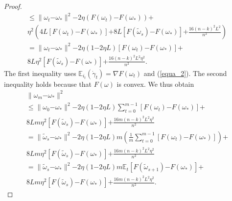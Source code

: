 \documentclass[letterpaper]{article}
\begin{document}
\begin{proof}
\begin{equation}
\begin{array}{ll}
\le \parallel  \omega_{t}\mathrm{-}\omega_\ast  \parallel^2  \mathrm{-}2\eta( F(\omega_t) \mathrm{-} F(\omega_\ast) ) \mathrm{+} \\
\eta^2 \left(  4L [F(\omega_t)\mathrm{-}F(\omega_\ast)] \mathrm{+} 8L [F(\tilde{\omega}_s)\mathrm{-}F(\omega_\ast)] \mathrm{+} \frac{16(n-k)^2L^2}{n^2}\right)  \\ 
= \parallel  \omega_{t}\mathrm{-}\omega_\ast  \parallel^2  \mathrm{-}2\eta(1\mathrm{-}2\eta L) [F(\omega_t) \mathrm{-} F(\omega_\ast) ] \mathrm{+} \\
8L \eta^2 [F(\tilde{\omega}_s)\mathrm{-}F(\omega_\ast)] \mathrm{+} \frac{16(n-k)^2L^2\eta^2}{n^2}.
\end{array} 
\end{equation} The first inequality uses $\mathbb{E}_{i_t}(\dot{\gamma}_t) \mathrm{=} \nabla F(\omega_t)$ and (\ref{equa_2}). The second inequality holds because that $F(\omega)$ is convex.  We thus obtain 
\begin{equation}
\begin{array}{ll}
\parallel  \omega_{m}\mathrm{-}\omega_\ast \parallel^2\\
\le \parallel  \omega_{0}\mathrm{-}\omega_\ast  \parallel^2  \mathrm{-}2\eta(1\mathrm{-}2\eta L)\sum\limits_{t=0}^{m-1} [F(\omega_t) \mathrm{-} F(\omega_\ast) ] \mathrm{+} \\
8Lm \eta^2 [F(\tilde{\omega}_s)\mathrm{-}F(\omega_\ast)] \mathrm{+}\frac{16m(n-k)^2L^2\eta^2}{n^2} \\
=\parallel  \tilde{\omega}_{s}\mathrm{-}\omega_\ast  \parallel^2  \mathrm{-}2\eta(1\mathrm{-}2\eta L)m \left(\frac{1}{m}\sum\limits_{t=0}^{m-1} [F(\omega_t) \mathrm{-} F(\omega_\ast) ] \right)\mathrm{+} \\
8Lm \eta^2 [F(\tilde{\omega}_s)\mathrm{-}F(\omega_\ast)] \mathrm{+} \frac{16m(n-k)^2L^2\eta^2}{n^2}\\
= \parallel  \tilde{\omega}_{s}\mathrm{-}\omega_\ast  \parallel^2  \mathrm{-}2\eta(1\mathrm{-}2\eta L)m \mathbb{E}_t[F(\tilde{\omega}_{s+1}) \mathrm{-} F(\omega_\ast) ] \mathrm{+} \\
8Lm \eta^2 [F(\tilde{\omega}_s)\mathrm{-}F(\omega_\ast)] \mathrm{+}\frac{16m(n-k)^2L^2\eta^2}{n^2}.

\end{array}
\end{equation}
\end{proof}
\end{document}
